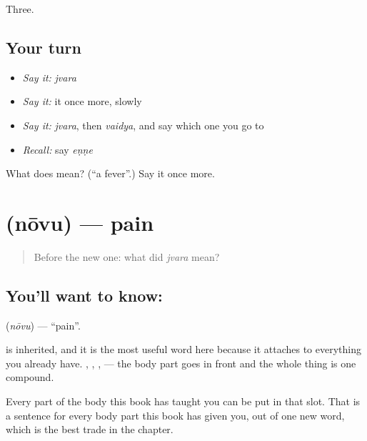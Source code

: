 \begin{grammarlens}[title={What you've built}]
Three.
\end{grammarlens}

\subsection*{Your turn}
\begin{itemize}
\raggedright
  \item \emph{Say it:} \emph{jvara}
  \item \emph{Say it:} it once more, slowly
  \item \emph{Say it:} \emph{jvara}, then \emph{vaidya}, and say which one you go to
  \item \emph{Recall:} say \emph{eṇṇe}
\end{itemize}

\begin{tcolorbox}[breakable,colback=teal!4,colframe=teal!35!black,title={Before you move on}]
What does  mean? (\textquotedblleft{}a fever\textquotedblright{}.) Say it once more.
\end{tcolorbox}
\section[\texorpdfstring{\kn{ನೋವು} (nōvu)}{ನೋವು (nōvu)}]{ (nōvu) — pain}

\label{lesson:KA-C63-pain}



\begin{quote}
Before the new one: what did \emph{jvara} mean?
\end{quote}

\subsection*{You'll want to know: }
\textbf{} (\emph{nōvu}) — \textquotedblleft{}pain\textquotedblright{}.

 is inherited, and it is the most useful word here because it attaches to everything you already have.  ,  ,  ,   — the body part goes in front and the whole thing is one compound.

Every part of the body this book has taught you can be put in that slot. That is a sentence for every body part this book has given you, out of one new word, which is the best trade in the chapter.

